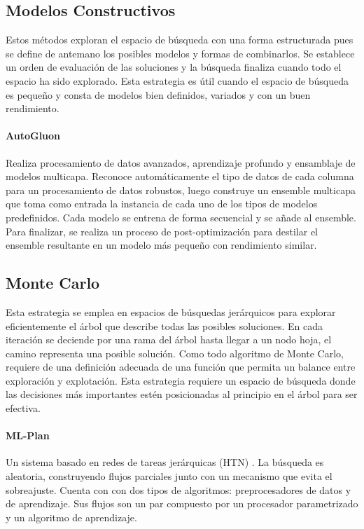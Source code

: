 
\subsection{Modelos Constructivos}
Estos m\'etodos exploran el espacio de b\'usqueda con una forma estructurada pues se define de antemano los posibles modelos y formas de combinarlos. Se establece un orden de evaluaci\'on de las soluciones y la b\'usqueda finaliza cuando todo el espacio ha sido explorado. Esta estrategia es \'util cuando el espacio de b\'usqueda es peque\~no y consta de modelos bien definidos, variados y con un buen rendimiento.

\paragraph{AutoGluon } Realiza procesamiento de datos avanzados, aprendizaje profundo y ensamblaje de modelos multicapa. Reconoce autom\'aticamente el tipo de datos de cada columna para un procesamiento de datos robustos, luego construye un ensemble multicapa  que toma como entrada la instancia de cada uno de los tipos de modelos predefinidos. Cada modelo se entrena de forma secuencial y se a\~nade al ensemble. Para finalizar, se realiza un proceso de post-optimizaci\'on para destilar el ensemble resultante en un modelo m\'as peque\~no con rendimiento similar.

\subsection{Monte Carlo}
 Esta estrategia se emplea en espacios de b\'usquedas jer\'arquicos para explorar eficientemente el \'arbol que describe todas las  posibles soluciones. En cada iteraci\'on se deciende por una rama del \'arbol hasta llegar a un nodo hoja, el camino representa una posible soluci\'on. Como todo algoritmo de Monte Carlo, requiere de una definici\'on adecuada de una funci\'on que permita un balance entre exploraci\'on y explotaci\'on. Esta estrategia requiere un espacio de b\'usqueda donde las decisiones m\'as importantes est\'en posicionadas al principio en el \'arbol para ser efectiva.

 \paragraph{ML-Plan } Un sistema basado en redes de tareas jer\'arquicas (HTN) . La b\'usqueda es aleatoria, construyendo flujos parciales junto con un mecanismo que evita el sobreajuste. Cuenta con con dos tipos de algoritmos:  preprocesadores de datos y de aprendizaje. Sus flujos son un par compuesto por un procesador parametrizado y un algoritmo de aprendizaje.
    


